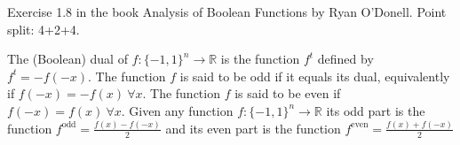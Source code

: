 \documentclass[12pt, a4paper, onecolumn]{exam}
\begin{document}
\begin{questions}
\begin{parts}
		\begin{solution}

		\end{solution}

	\end{parts}

	\question[10] Exercise 1.8 in the book Analysis of Boolean Functions by Ryan O'Donell. Point split: 4+2+4.

	The (Boolean) dual of $f:\{-1,1\}^n\to \mathbb{R}$ is the function $f^{t}$
	defined by $f^{t} = - f(-x)$. The function $f$ is said to be odd if it equals
	its dual, equivalently if $f(-x) = -f(x) \: \forall x$. The function $f$ is
	said to be even if $f(-x) = f(x) \: \forall x$. Given any function
	$f:\{-1,1\}^n \to \mathbb{R}$ its odd part is the function $f^{\text{odd}} =
		\frac{f(x) - f(-x)}{2}$ and its even part is the function $f^{\text{even}} =
		\frac{f(x) + f(-x)}{2}$


	\question[10]
\end{questions}
\end{document}
